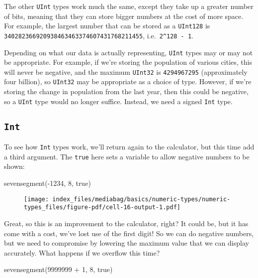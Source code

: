 \documentclass[
  letterpaper,
  DIV=11,
  numbers=noendperiod]{scrreprt}
\newenvironment{Shaded}{\begin{snugshade}}{\end{snugshade}}
\newcommand{\ConstantTok}[1]{\textcolor[rgb]{0.56,0.35,0.01}{#1}}
\newcommand{\FloatTok}[1]{\textcolor[rgb]{0.68,0.00,0.00}{#1}}
\newcommand{\FunctionTok}[1]{\textcolor[rgb]{0.28,0.35,0.67}{#1}}
\newcommand{\NormalTok}[1]{\textcolor[rgb]{0.00,0.23,0.31}{#1}}
\newcommand{\OperatorTok}[1]{\textcolor[rgb]{0.37,0.37,0.37}{#1}}
\begin{document}
The other \texttt{UInt} types work much the same, except they take up a
greater number of bits, meaning that they can store bigger numbers at
the cost of more space. For example, the largest number that can be
stored as a \texttt{UInt128} is
\texttt{340282366920938463463374607431768211455},
i.e.~\texttt{2\^{}128\ -\ 1}.

Depending on what our data is actually representing, \texttt{UInt} types
may or may not be appropriate. For example, if we're storing the
population of various cities, this will never be negative, and the
maximum \texttt{UInt32} is \texttt{4294967295} (approximately four
billion), so \texttt{UInt32} may be appropriate as a choice of type.
However, if we're storing the change in population from the last year,
then this could be negative, so a \texttt{UInt} type would no longer
suffice. Instead, we need a signed \texttt{Int} type.

\hypertarget{int}{%
\subsection{\texorpdfstring{\texttt{Int}}{Int}}\label{int}}

To see how \texttt{Int} types work, we'll return again to the
calculator, but this time add a third argument. The \texttt{true} here
sets a variable to allow negative numbers to be shown:

\begin{Shaded}
\begin{Highlighting}[]
\FunctionTok{sevensegment}\NormalTok{(}\OperatorTok{{-}}\FloatTok{1234}\NormalTok{, }\FloatTok{8}\NormalTok{, }\ConstantTok{true}\NormalTok{)}
\end{Highlighting}
\end{Shaded}

\begin{figure}[H]

{\centering \texttt{[image: index\_files/mediabag/basics/numeric-types/numeric-types\_files/figure-pdf/cell-16-output-1.pdf]}

}

\end{figure}

Great, so this is an improvement to the calculator, right? It could be,
but it has come with a cost, we've lost use of the first digit! So we
can do negative numbers, but we need to compromise by lowering the
maximum value that we can display accurately. What happens if we
overflow this time?

\begin{Shaded}
\begin{Highlighting}[]
\FunctionTok{sevensegment}\NormalTok{(}\FloatTok{9999999} \OperatorTok{+} \FloatTok{1}\NormalTok{, }\FloatTok{8}\NormalTok{, }\ConstantTok{true}\NormalTok{)}
\end{Highlighting}
\end{Shaded}
\end{document}
